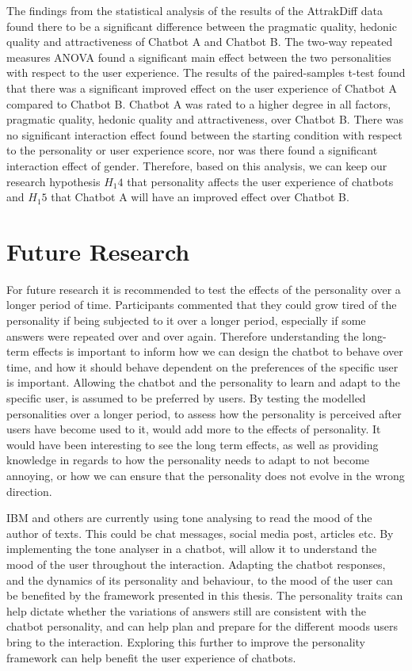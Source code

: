 The findings from the statistical analysis of the results of the AttrakDiff data found there to be a significant difference between the pragmatic quality, hedonic quality and attractiveness of Chatbot A and Chatbot B. The two-way repeated measures ANOVA found a significant main effect between the two personalities with respect to the user experience. The results of the paired-samples t-test found that there was a significant improved effect on the user experience of Chatbot A compared to Chatbot B. Chatbot A was rated to a higher degree in all factors, pragmatic quality, hedonic quality and attractiveness, over Chatbot B. There was no significant interaction effect found between the starting condition with respect to the personality or user experience score, nor was there found a significant interaction effect of gender. Therefore, based on this analysis, we can keep our research hypothesis $H_1 4$ that personality affects the user experience of chatbots and $H_1 5$ that Chatbot A will have an improved effect over Chatbot B. 

\section{Future Research}
\label{sec:future}

For future research it is recommended to test the effects of the personality over a longer period of time. Participants commented that they could grow tired of the personality if being subjected to it over a longer period, especially if some answers were repeated over and over again. Therefore understanding the long-term effects is important to inform how we can design the chatbot to behave over time, and how it should behave dependent on the preferences of the specific user is important. Allowing the chatbot and the personality to learn and adapt to the specific user, is assumed to be preferred by users. By testing the modelled personalities over a longer period, to assess how the personality is perceived after users have become used to it, would add more to the effects of personality. It would have been interesting to see the long term effects, as well as providing knowledge in regards to how the personality needs to adapt to not become annoying, or how we can ensure that the personality does not evolve in the wrong direction.

IBM and others are currently using tone analysing to read the mood of the author of texts. This could be chat messages, social media post, articles etc. By implementing the tone analyser in a chatbot, will allow it to understand the mood of the user throughout the interaction. Adapting the chatbot responses, and the dynamics of its personality and behaviour, to the mood of the user can be benefited by the framework presented in this thesis. The personality traits can help dictate whether the variations of answers still are consistent with the chatbot personality, and can help plan and prepare for the different moods users bring to the interaction. Exploring this further to improve the personality framework can help benefit the user experience of chatbots.

